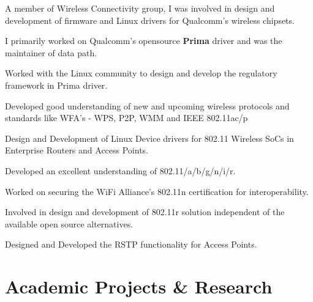\documentclass[letterpaper]{deedy-resume} %
\begin{document}
\begin{minipage}[t]{0.74\textwidth}

\begin{tightitemize}
\item A member of Wireless Connectivity group, I was involved in design and development of firmware and Linux drivers for Qualcomm's wireless chipsets.
\item I primarily worked on Qualcomm's opensource \textbf{Prima} driver and was the maintainer of data path.
\item Worked with the Linux community to design and develop the regulatory framework in Prima driver.
\item Developed good understanding of new and upcoming wireless protocols and standards like WFA's - WPS, P2P, WMM and IEEE 802.11ac/p
\end{tightitemize}

\sectionspace %



\begin{tightitemize}
\item Design and Development of Linux Device drivers for 802.11 Wireless SoCs in Enterprise Routers and Access Points.
\item Developed an excellent understanding of 802.11/a/b/g/n/i/r.
\item Worked on securing the WiFi Alliance's 802.11n certification for interoperability.
\item Involved in design and development of 802.11r solution independent of the available open source alternatives.
\item Designed and Developed the RSTP functionality for Access Points.
\end{tightitemize}

\sectionspace %


\section{Academic Projects \& Research}


\end{minipage}
\end{document}
